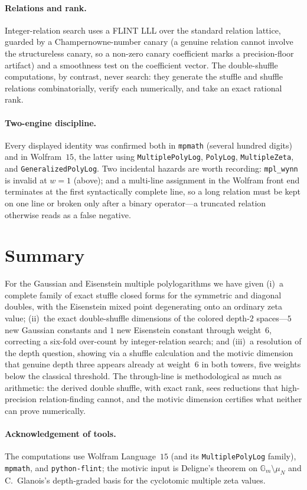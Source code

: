 \documentclass[11pt]{article}
\theoremstyle{plain}
\theoremstyle{remark}
\begin{document}
\paragraph{Relations and rank.} Integer-relation search uses a FLINT LLL over the standard relation
lattice, guarded by a Champernowne-number canary (a genuine relation cannot involve the structureless
canary, so a non-zero canary coefficient marks a precision-floor artifact) and a smoothness test on
the coefficient vector. The double-shuffle computations, by contrast, never search: they generate the
stuffle and shuffle relations combinatorially, verify each numerically, and take an exact rational
rank.

\paragraph{Two-engine discipline.} Every displayed identity was confirmed both in \texttt{mpmath}
(several hundred digits) and in Wolfram~$15$, the latter using \texttt{MultiplePolyLog},
\texttt{PolyLog}, \texttt{MultipleZeta}, and \texttt{GeneralizedPolyLog}. Two incidental hazards are
worth recording: \texttt{mpl\_wynn} is invalid at $w=1$ (above); and a multi-line assignment in the
Wolfram front end terminates at the first syntactically complete line, so a long relation must be kept
on one line or broken only after a binary operator---a truncated relation otherwise reads as a false
negative.

\section{Summary}\label{sec:summary}

For the Gaussian and Eisenstein multiple polylogarithms we have given (i)~a complete family of exact
stuffle closed forms for the symmetric and diagonal doubles, with the Eisenstein mixed point
degenerating onto an ordinary zeta value; (ii)~the exact double-shuffle dimensions of the colored
depth-$2$ spaces---$5$ new Gaussian constants and $1$ new Eisenstein constant through weight~$6$,
correcting a six-fold over-count by integer-relation search; and (iii)~a resolution of the depth
question, showing via a shuffle calculation and the motivic dimension that genuine depth three appears
already at weight~$6$ in both towers, five weights below the classical threshold. The through-line is
methodological as much as arithmetic: the derived double shuffle, with exact rank, sees reductions
that high-precision relation-finding cannot, and the motivic dimension certifies what neither can
prove numerically.

\paragraph{Acknowledgement of tools.} The computations use Wolfram Language~$15$ (and its
\texttt{MultiplePolyLog} family), \texttt{mpmath}, and \texttt{python-flint}; the motivic input is
Deligne's theorem on $\mathbb{G}_m\setminus\mu_N$ and C.~Glanois's depth-graded basis for the
cyclotomic multiple zeta values.
\end{document}
